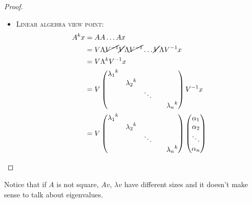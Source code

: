 \documentclass[ComputationalMathematics.tex]{subfiles}
\begin{document}
\begin{proof}
\begin{itemize}
  \item \textsc{Linear algebra view point:}
    \begin{equation}
      \begin{split}
        A^k x &= A A \ldots A x\\
        &=V \Lambda \cancel{{V}^{-1}} \cancel{V} \Lambda \cancel{{V}^{-1}} \ldots \cancel{V} \Lambda {V}^{-1} x\\
        &= V \Lambda^k {V}^{-1} x\\
        &=V \begin{pmatrix}
          {\lambda_1}^k\\
          & {\lambda_2}^k\\
          && \ddots\\
          &&&& {\lambda_n}^k\\
        \end{pmatrix}
        {V}^{-1} x\\
        &=V \begin{pmatrix}
          {\lambda_1}^k\\
          & {\lambda_2}^k\\
          && \ddots\\
          &&&& {\lambda_n}^k\\
        \end{pmatrix}
        \begin{pmatrix}
          {\alpha_1}\\
          {\alpha_2}\\
          \ddots\\
          {\alpha_n}\\
        \end{pmatrix}
      \end{split}
    \end{equation}

  \end{itemize}
\end{proof}

Notice that if $A$ is not square, $Av$, $\lambda v$ have different sizes and it doesn't make sense to talk about eigenvalues.
\end{document}

